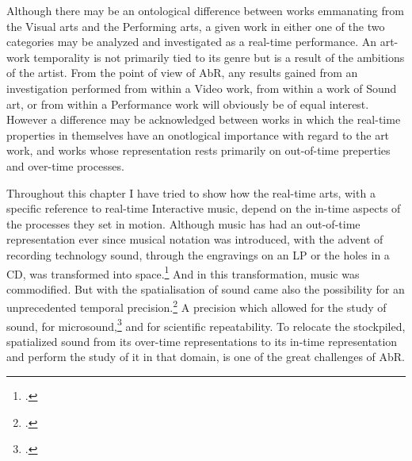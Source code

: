 Although there may be an ontological difference between works emmanating from the Visual arts and the Performing arts, a given work in either one of the two categories may be analyzed and investigated as a real-time performance. An art-work temporality is not primarily tied to its genre but is a result of the ambitions of the artist. From the point of view of AbR, any results gained from an investigation performed from within a Video work, from within a work of Sound art, or from within a Performance work will obviously be of equal interest. However a  difference may be acknowledged between works in which the real-time properties in themselves have an onotlogical importance with regard to the art work, and works whose representation rests primarily on out-of-time preperties and over-time processes.


Throughout this chapter I have tried to show how the real-time arts, with a specific reference to real-time Interactive music, depend on the in-time aspects of the processes they set in motion. Although music has had an out-of-time representation ever since musical notation was introduced, with the advent of recording technology sound, through the engravings on an LP or the holes in a CD, was transformed into space.\footcite[``We might say that recording is a reflux, or distillation in which time is boiled off, for time must be added back in to get sound, in the form of a steady motion of the turntable or tape heads or the crystal clock in digital recording.''][54]{evens05} And in this transformation, music was commodified. But with the spatialisation of sound came also the possibility for an unprecedented temporal precision.\footcite[4]{moore90} A precision which allowed for the study of sound, for microsound,\footcite{roads} and for scientific repeatability. To relocate the stockpiled, spatialized sound from its over-time representations to its in-time representation and perform the study of it in that domain, is one of the great challenges of AbR. 






